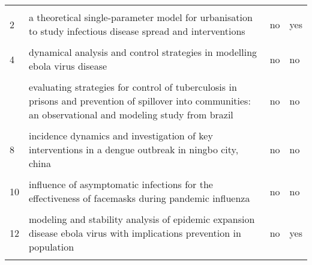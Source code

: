 \documentclass[
]{article}
\begin{document}
\begin{landscape}
\begin{longtable}{l>{\raggedright\arraybackslash}p{4cm}l>{\raggedright\arraybackslash}p{4cm}}
\endfoot
\bottomrule
\endlastfoot
\cellcolor{gray!6}{1} & \cellcolor{gray!6}{a cholera metapopulation model interlinking migration with intervention strategies - a case study of zimbabwe (2008-2009)} & \cellcolor{gray!6}{no} & \cellcolor{gray!6}{yes}\\
2 & a theoretical single-parameter model for urbanisation to study infectious disease spread and interventions & no & yes\\
\cellcolor{gray!6}{3} & \cellcolor{gray!6}{assessing the effects of modeling the spectrum of clinical symptoms on the dynamics and control of ebola} & \cellcolor{gray!6}{no} & \cellcolor{gray!6}{no}\\
4 & dynamical analysis and control strategies in modelling ebola virus disease & no & no\\
\cellcolor{gray!6}{5} & \cellcolor{gray!6}{effect of a hepatitis a vaccination campaign during a hepatitis a outbreak in taiwan, 2015–2017: a modeling study} & \cellcolor{gray!6}{no} & \cellcolor{gray!6}{yes}\\
\addlinespace
6 & evaluating strategies for control of tuberculosis in prisons and prevention of spillover into communities: an observational and modeling study from brazil & no & no\\
\cellcolor{gray!6}{7} & \cellcolor{gray!6}{evaluating the effects of control interventions and estimating the inapparent infections for dengue outbreak in hangzhou, china} & \cellcolor{gray!6}{no} & \cellcolor{gray!6}{no}\\
8 & incidence dynamics and investigation of key interventions in a dengue outbreak in ningbo city, china & no & no\\
\cellcolor{gray!6}{9} & \cellcolor{gray!6}{incorporating media data into a model of infectious disease transmission} & \cellcolor{gray!6}{no} & \cellcolor{gray!6}{no}\\
10 & influence of asymptomatic infections for the effectiveness of facemasks during pandemic influenza & no & no\\
\addlinespace
\cellcolor{gray!6}{11} & \cellcolor{gray!6}{mathematical analysis of a cholera infection model with vaccination strategy} & \cellcolor{gray!6}{no} & \cellcolor{gray!6}{yes}\\
12 & modeling and stability analysis of epidemic expansion disease ebola virus with implications prevention in population & no & yes\\
\cellcolor{gray!6}{13} & \cellcolor{gray!6}{modeling the effectiveness of respiratory protective devices in reducing influenza outbreak} & \cellcolor{gray!6}{no} & \cellcolor{gray!6}{no}\\

\end{longtable}
\end{landscape}
\end{document}
